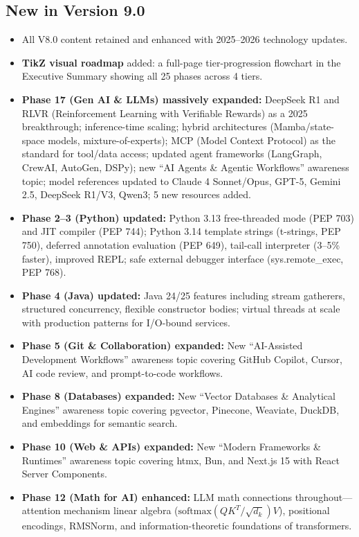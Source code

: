 \documentclass[11pt, a4paper, oneside]{report}
\begin{document}
\subsection*{New in Version 9.0}
\begin{itemize}[leftmargin=*]
\item All V8.0 content retained and enhanced with 2025--2026 technology updates.
\item \textbf{TikZ visual roadmap} added: a full-page tier-progression flowchart in the Executive Summary showing all 25 phases across 4 tiers.
\item \textbf{Phase 17 (Gen AI \& LLMs) massively expanded:} DeepSeek R1 and RLVR (Reinforcement Learning with Verifiable Rewards) as a 2025 breakthrough; inference-time scaling; hybrid architectures (Mamba/state-space models, mixture-of-experts); MCP (Model Context Protocol) as the standard for tool/data access; updated agent frameworks (LangGraph, CrewAI, AutoGen, DSPy); new ``AI Agents \& Agentic Workflows'' awareness topic; model references updated to Claude 4 Sonnet/Opus, GPT-5, Gemini 2.5, DeepSeek R1/V3, Qwen3; 5 new resources added.
\item \textbf{Phase 2--3 (Python) updated:} Python 3.13 free-threaded mode (PEP 703) and JIT compiler (PEP 744); Python 3.14 template strings (t-strings, PEP 750), deferred annotation evaluation (PEP 649), tail-call interpreter (3--5\% faster), improved REPL; safe external debugger interface (sys.remote\_exec, PEP 768).
\item \textbf{Phase 4 (Java) updated:} Java 24/25 features including stream gatherers, structured concurrency, flexible constructor bodies; virtual threads at scale with production patterns for I/O-bound services.
\item \textbf{Phase 5 (Git \& Collaboration) expanded:} New ``AI-Assisted Development Workflows'' awareness topic covering GitHub Copilot, Cursor, AI code review, and prompt-to-code workflows.
\item \textbf{Phase 8 (Databases) expanded:} New ``Vector Databases \& Analytical Engines'' awareness topic covering pgvector, Pinecone, Weaviate, DuckDB, and embeddings for semantic search.
\item \textbf{Phase 10 (Web \& APIs) expanded:} New ``Modern Frameworks \& Runtimes'' awareness topic covering htmx, Bun, and Next.js 15 with React Server Components.
\item \textbf{Phase 12 (Math for AI) enhanced:} LLM math connections throughout---attention mechanism linear algebra ($\mathrm{softmax}(QK^T/\sqrt{d_k})V$), positional encodings, RMSNorm, and information-theoretic foundations of transformers.

\end{itemize}
\end{document}
